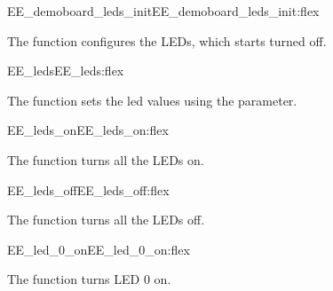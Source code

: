 \begin{function_nopb2}{EE\_demoboard\_leds\_init}{EE_demoboard_leds_init:flex}
  
  \begin{fundescription}
    The function configures the LEDs, which starts turned off.
  \end{fundescription}
  
  
  
\end{function_nopb2}


\begin{function_nopb2}{EE\_leds}{EE_leds:flex}
  
  \begin{fundescription}
    The function sets the led values using the  parameter.
  \end{fundescription}
\end{function_nopb2}

\begin{function_nopb2}{EE\_leds\_on}{EE_leds_on:flex}
  
  \begin{fundescription}
    The function turns all the LEDs on.
  \end{fundescription}
\end{function_nopb2}

\begin{function_nopb2}{EE\_leds\_off}{EE_leds_off:flex}
  
  \begin{fundescription}
    The function turns all the LEDs off.
  \end{fundescription}
\end{function_nopb2}

\begin{function_nopb2}{EE\_led\_0\_on}{EE_led_0_on:flex}
  
  \begin{fundescription}
    The function turns LED 0 on.
  \end{fundescription}
\end{function_nopb2}

